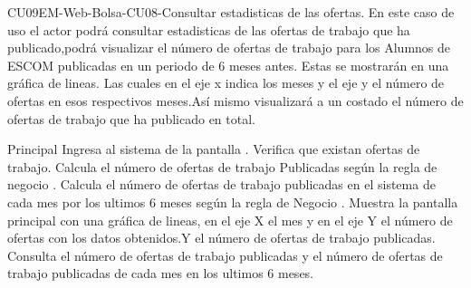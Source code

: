


	\begin{UseCase}{CU09}{EM-Web-Bolsa-CU08-Consultar estadisticas de las ofertas.}{
		En este caso de uso el actor podrá consultar estadisticas de las ofertas de trabajo que ha publicado,podrá visualizar el número de ofertas de trabajo para los Alumnos de ESCOM publicadas en un periodo de 6 meses antes. Estas se mostrarán en una gráfica de lineas. Las cuales en el eje x indica los meses y el eje y el número de ofertas en esos respectivos meses.Así mismo visualizará a un costado el número de ofertas  de trabajo que ha publicado en total.}


	\end{UseCase}
	\newpage
	
	\begin{UCtrayectoria}{Principal}
	\UCpaso[\UCactor] Ingresa al sistema de la pantalla  .
	\UCpaso Verifica que existan ofertas de trabajo.
	\UCpaso Calcula el número de ofertas de trabajo Publicadas según la regla de negocio  .
	\UCpaso Calcula el número de ofertas de trabajo publicadas en el sistema de cada mes por los ultimos 6 meses según la regla de Negocio .
	\UCpaso Muestra la pantalla principal  con una gráfica de lineas, en el eje X el mes y en el eje Y el número de ofertas con los datos obtenidos.Y el número de ofertas de trabajo publicadas.
 	\UCpaso Consulta el número de ofertas de trabajo publicadas y el número de ofertas de trabajo publicadas de cada mes en los ultimos 6 meses.
	

	\end{UCtrayectoria}



